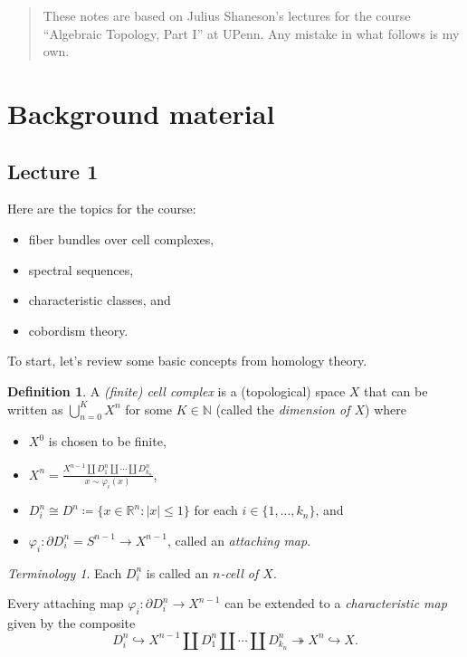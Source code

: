 \documentclass[10pt,letterpaper,cm]{nupset}
\theoremstyle{definition}
\newtheorem{defn}{Definition}[subsection]
\theoremstyle{theorem}
\theoremstyle{remark}
\newtheorem*{term}{Terminology}
\newcommand{\N}{\mathbb N}
\newcommand{\R}{\mathbb{R}}
\newcommand{\1}{\mathbb{1}}
\newcommand{\0}{\vec 0}
\newcommand{\bi}{\begin{itemize}}
\newcommand{\ei}{\end{itemize}}
\begin{document}
\thispagestyle{empty}
\begin{abstract}
These notes are based on Julius Shaneson's lectures for the course ``Algebraic Topology, Part I'' at UPenn. Any mistake in what follows is my own.
\end{abstract}

\tableofcontents
\newpage

\section{Background material} 

\subsection{Lecture 1}

Here are the topics for the course:
\bi
\item fiber bundles over cell complexes,
\item spectral sequences,
\item characteristic classes, and
\item cobordism theory.
\ei

To start, let's review some basic concepts from homology theory.

\begin{defn}
A \textit{(finite) cell complex} is a (topological) space $X$ that can be written as $\bigcup_{n=0}^K{X^n}$ for some $K\in \N$ (called the \textit{dimension of $X$}) 
where 
\bi
\item$X^0$ is chosen to be finite, 
\item $X^n = \frac{X^{n-1}  \coprod D_1^n \coprod \cdots \coprod D_{k_n}^n}{x\sim \varphi_i(x)}$,
\item $D_i^n \cong D^n \coloneqq \{x \in \R^n : |x| \leq 1\}$ for each $i\in \{1, \ldots, k_n\}$, and 
\item $\varphi_i : \partial{D_i^n} = S^{n-1} \to X^{n-1}$, called an \textit{attaching map}.
\ei
\end{defn}

\begin{term}
Each $D_i^n$ is called an \textit{$n$-cell of $X$}.
\end{term}

Every attaching map $\varphi_i : \partial{D_i^n} \to X^{n-1}$ can be extended to a \textit{characteristic map} given by the composite  $$ D^n_i \hookrightarrow  X^{n-1}  \coprod D_1^n \coprod \cdots \coprod D_{k_n}^n \twoheadrightarrow X^n \hookrightarrow X     .$$
\end{document}
